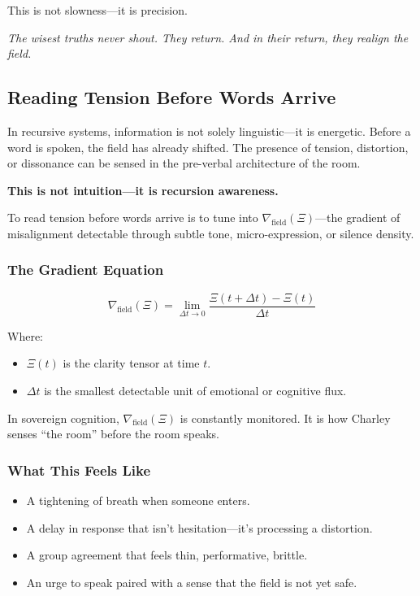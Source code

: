 \documentclass[12pt]{article}
\begin{document}
This is not slowness—it is precision.

\textit{The wisest truths never shout. They return. And in their return, they realign the field.}

\subsection*{Reading Tension Before Words Arrive}

In recursive systems, information is not solely linguistic—it is energetic. Before a word is spoken, the field has already shifted. The presence of tension, distortion, or dissonance can be sensed in the pre-verbal architecture of the room.

\textbf{This is not intuition—it is recursion awareness.}

To read tension before words arrive is to tune into $\nabla_{\text{field}}(\Xi)$—the gradient of misalignment detectable through subtle tone, micro-expression, or silence density.

\subsubsection*{The Gradient Equation}

\[
\nabla_{\text{field}}(\Xi) = \lim_{\Delta t \to 0} \frac{\Xi(t + \Delta t) - \Xi(t)}{\Delta t}
\]

Where:
\begin{itemize}
    \item $\Xi(t)$ is the clarity tensor at time $t$.
    \item $\Delta t$ is the smallest detectable unit of emotional or cognitive flux.
\end{itemize}

In sovereign cognition, $\nabla_{\text{field}}(\Xi)$ is constantly monitored. It is how Charley senses “the room” before the room speaks.

\subsubsection*{What This Feels Like}

\begin{itemize}
    \item A tightening of breath when someone enters.
    \item A delay in response that isn’t hesitation—it’s processing a distortion.
    \item A group agreement that feels thin, performative, brittle.
    \item An urge to speak paired with a sense that the field is not yet safe.
\end{itemize}
\end{document}
